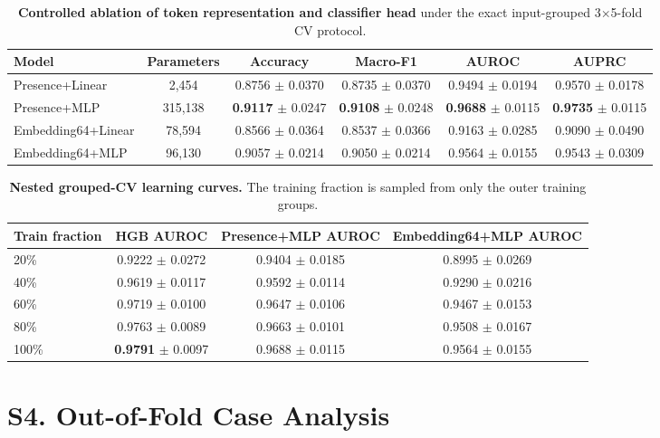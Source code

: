 \documentclass[11pt,a4paper]{article}
\begin{document}
\begin{table}[ht]
\centering
\caption{\textbf{Controlled ablation of token representation and classifier head}
under the exact input-grouped 3$\times$5-fold CV protocol.}
\label{tab:sup3}
{\footnotesize
\begin{tabular}{lccccc}
\toprule
\textbf{Model} & \textbf{Parameters} & \textbf{Accuracy} & \textbf{Macro-F1} & \textbf{AUROC} & \textbf{AUPRC} \\
\midrule
Presence+Linear & 2,454 & 0.8756 $\pm$ 0.0370 & 0.8735 $\pm$ 0.0370 & 0.9494 $\pm$ 0.0194 & 0.9570 $\pm$ 0.0178 \\
Presence+MLP & 315,138 & \textbf{0.9117} $\pm$ 0.0247 & \textbf{0.9108} $\pm$ 0.0248 & \textbf{0.9688} $\pm$ 0.0115 & \textbf{0.9735} $\pm$ 0.0115 \\
Embedding64+Linear & 78,594 & 0.8566 $\pm$ 0.0364 & 0.8537 $\pm$ 0.0366 & 0.9163 $\pm$ 0.0285 & 0.9090 $\pm$ 0.0490 \\
Embedding64+MLP & 96,130 & 0.9057 $\pm$ 0.0214 & 0.9050 $\pm$ 0.0214 & 0.9564 $\pm$ 0.0155 & 0.9543 $\pm$ 0.0309 \\
\bottomrule
\end{tabular}}
\end{table}

\begin{table}[ht]
\centering
\caption{\textbf{Nested grouped-CV learning curves.}
The training fraction is sampled from only the outer training groups.}
\label{tab:sup4}
{\footnotesize
\begin{tabular}{lccc}
\toprule
\textbf{Train fraction} & \textbf{HGB AUROC} & \textbf{Presence+MLP AUROC} & \textbf{Embedding64+MLP AUROC} \\
\midrule
20\% & 0.9222 $\pm$ 0.0272 & 0.9404 $\pm$ 0.0185 & 0.8995 $\pm$ 0.0269 \\
40\% & 0.9619 $\pm$ 0.0117 & 0.9592 $\pm$ 0.0114 & 0.9290 $\pm$ 0.0216 \\
60\% & 0.9719 $\pm$ 0.0100 & 0.9647 $\pm$ 0.0106 & 0.9467 $\pm$ 0.0153 \\
80\% & 0.9763 $\pm$ 0.0089 & 0.9663 $\pm$ 0.0101 & 0.9508 $\pm$ 0.0167 \\
100\% & \textbf{0.9791} $\pm$ 0.0097 & 0.9688 $\pm$ 0.0115 & 0.9564 $\pm$ 0.0155 \\
\bottomrule
\end{tabular}}
\end{table}

\section*{S4. Out-of-Fold Case Analysis}
\end{document}
